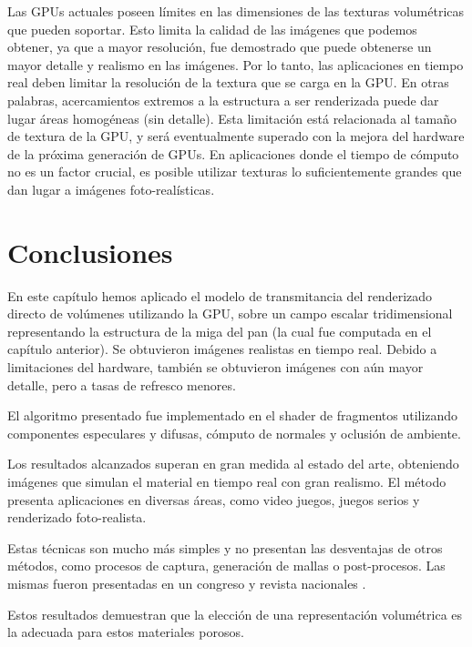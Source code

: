 Las GPUs actuales poseen límites en las dimensiones de las texturas volumétricas que pueden soportar.
Esto limita la calidad de las imágenes que podemos obtener, ya que a mayor resolución, fue demostrado que puede obtenerse un mayor detalle y realismo en las imágenes.
Por lo tanto, las aplicaciones en tiempo real deben limitar la resolución de la textura que se carga en la GPU.
En otras palabras, acercamientos extremos a la estructura a ser renderizada puede dar lugar áreas homogéneas (sin detalle).
Esta limitación está relacionada al tamaño de textura de la GPU, y será eventualmente superado con la mejora del hardware de la próxima generación de GPUs.
En aplicaciones donde el tiempo de cómputo no es un factor crucial, es posible utilizar texturas lo suficientemente grandes que dan lugar a imágenes foto-realísticas.

\section{Conclusiones}

En este capítulo hemos aplicado el modelo de transmitancia del renderizado directo de volúmenes utilizando la GPU, sobre un campo escalar tridimensional representando la estructura de la miga del pan (la cual fue computada en el capítulo anterior).
Se obtuvieron imágenes realistas en tiempo real.
Debido a limitaciones del hardware, también se obtuvieron imágenes con aún mayor detalle, pero a tasas de refresco menores.

El algoritmo presentado fue implementado en el shader de fragmentos utilizando componentes especulares y difusas, cómputo de normales y oclusión de ambiente.

Los resultados alcanzados superan en gran medida al estado del arte, obteniendo imágenes que simulan el material en tiempo real con gran realismo.
El método presenta aplicaciones en diversas áreas, como video juegos, juegos serios \cite{Susi2007} y renderizado foto-realista.

Estas técnicas son mucho más simples y no presentan las desventajas de otros métodos, como procesos de captura, generación de mallas o post-procesos.
Las mismas fueron presentadas en un congreso y revista nacionales \cite{Baravalle2014}.

Estos resultados demuestran que la elección de una representación volumétrica es la adecuada para estos materiales porosos.



